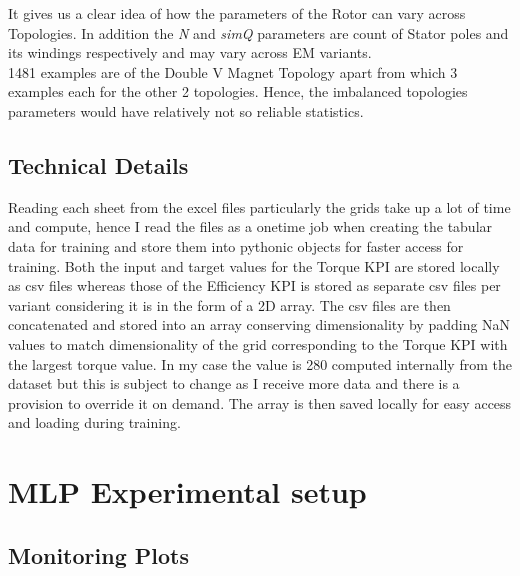\documentclass{report} %
\begin{document}
It gives us a clear idea of how the parameters of the Rotor can vary across Topologies.
In addition the \textit{N} and \textit{simQ} parameters are count of Stator poles and its windings respectively and may vary across \ac{EM} variants.\\
1481 examples are of the Double V Magnet Topology apart from which 3 examples each for the other 2 topologies.
Hence, the imbalanced topologies parameters would have relatively not so reliable statistics.\\ 

\subsection{Technical Details}
\label{subsec:Technical Details}

Reading each sheet from the excel files particularly the grids take up a lot of time and compute, hence I read the files as a onetime job when creating the 
tabular data for training  and store them into pythonic objects for faster access for training.
Both the input and target values for the Torque \ac{KPI} are stored locally as csv files whereas those of the Efficiency \ac{KPI} is stored as separate csv files per 
variant considering it is in the form of a 2\ac{D} array.
The csv files are then concatenated and stored into an array conserving dimensionality by padding \ac{NaN} values to match dimensionality of the grid 
corresponding to the Torque \ac{KPI} with the largest torque value.
In my case the value is 280 computed internally from the dataset but this is subject to change as I receive more data and there is a provision to override it 
on demand. The array is then saved locally for easy access and loading during training.

\section{MLP Experimental setup}
\label{sec:Experimental setup}

\subsection{Monitoring Plots}
\label{subsec:Monitoring Plots}
\end{document}
